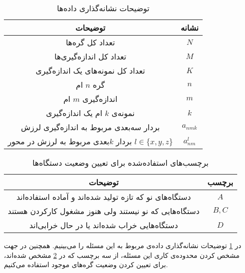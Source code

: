 \begin{table}[h!]
  \begin{center}
    \caption{توضیحات نشانه‌گذاری داده‌ها}
    \label{table:notation_description}
    \begin{tabular}{|c|c|} %
    	\hline
توضیحات & نشانه\\
    	\hline \hline
تعداد کل گره‌ها & $N$\\
    	\hline
 تعداد کل اندازه‌گیری‌ها & $M$\\
    	\hline
   تعداد کل نمونه‌های یک اندازه‌گیری & $K$\\
    	\hline
گره $n$ ام & $n$\\
 	\hline
اندازه‌گیری $m$ ام & $m$\\
 	\hline
نمونه‌ی $k$ ام یک اندازه‌گیری & $k$\\
 	\hline
بردار سه‌بعدی مربوط به اندازه‌گیری لرزش & $a_{nmk}$\\
 	\hline
بردار $k$بعدی مربوط به لرزش در محور $l \in \{x, y, z\}$  & $a^l_{nm}$\\
 	\hline
    \end{tabular}
  \end{center}
\end{table} 

\begin{table}[h!]
  \begin{center}
    \caption{برچسب‌های استفاده‌شده برای تعیین وضعیت دستگاه‌ها}
    \label{table:node_state_labels}
    \begin{tabular}{|c|c|} %
    	\hline
توضیحات & برچسب\\
    	\hline \hline
دستگاه‌های نو که تازه تولید شده‌اند و آماده استفاده‌اند & $A$\\
    	\hline
دستگاه‌هایی که نو نیستند ولی هنوز مشغول کارکردن هستند & $B, C$\\
    	\hline
  دستگاه‌هایی خراب‌ شده‌اند یا در حال خرابی‌اند & $D$\\
    	\hline
    \end{tabular}
  \end{center}
\end{table}

در \cref{table:notation_description} توضیحات نشانه‌گذاری داده‌ی مربوط به این مسئله را می‌بینیم. همچنین در جهت مشخص کردن محدوده‌ی کاری این مسئله، از سه برچسب که در \cref{table:node_state_labels} مشخص شده‌اند، برای تعیین کردن وضعیت گره‌های موجود استفاده می‌کنیم.


